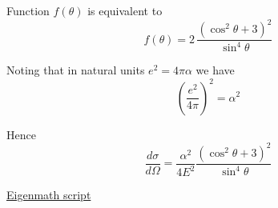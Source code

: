 Function $f(\theta)$ is equivalent to
\begin{equation*}
f(\theta)=2\,\frac{(\cos^2\theta+3)^2}{\sin^4\theta}
\end{equation*}

Noting that in natural units $e^2=4\pi\alpha$ we have
\begin{equation*}
\left(\frac{e^2}{4\pi}\right)^2=\alpha^2
\end{equation*}

Hence
\begin{equation*}
\frac{d\sigma}{d\Omega}=\frac{\alpha^2}{4E^2}
\frac{(\cos^2\theta+3)^2}{\sin^4\theta}
\end{equation*}

\href{https://georgeweigt.github.io/examples/moller-scattering-1-demo.html}{Eigenmath script}


